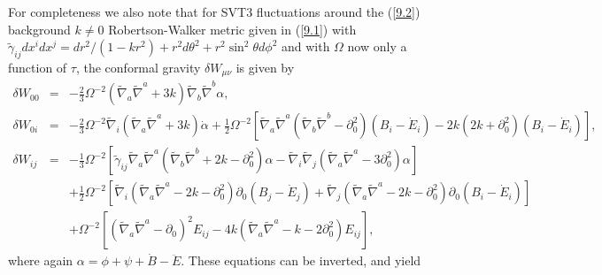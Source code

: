 \documentclass[aps,onecolumn,10pt]{revtex4}
\numberwithin{equation}{section}
\numberwithin{equation}{section}
\begin{document}
For completeness we also note that for  SVT3 fluctuations around the (\ref{9.2}) background $k\neq 0$ Robertson-Walker metric given in (\ref{9.1}) with $\tilde{\gamma}_{ij}dx^idx^j=dr^2/(1-kr^2)+r^2d\theta^2+r^2\sin^2\theta d\phi^2$ and with $\Omega$ now only a function of $\tau$, the conformal gravity $\delta W_{\mu\nu}$ is given by 
%
\begin{eqnarray}
\delta W_{00}&=& - \tfrac{2}{3} \Omega^{-2} (\tilde\nabla_a\tilde\nabla^a + 3k)\tilde\nabla_b\tilde\nabla^b \alpha,
 \nonumber\\ 
\delta W_{0i}&=& -\tfrac{2}{3} \Omega^{-2}  \tilde\nabla_i (\tilde\nabla_a\tilde\nabla^a + 3k)\dot\alpha
+\tfrac12 \Omega^{-2}\left[ \tilde\nabla_a\tilde\nabla^a (\tilde\nabla_b \tilde\nabla^b-\partial_0^2)(B_i-\dot{E}_i) -2k(2k+\partial_0^2)(B_i-\dot{E}_i)\right],
  \nonumber\\ 
\delta W_{ij}&=& -\tfrac{1}{3} \Omega^{-2} \left[ \tilde{\gamma}_{ij} \tilde\nabla_a\tilde\nabla^a (\tilde\nabla_b \tilde\nabla^b +2k-\partial_0^2)\alpha - \tilde\nabla_i\tilde\nabla_j(\tilde\nabla_a\tilde\nabla^a - 3\partial_0^2)\alpha \right]
\nonumber\\
&& +\tfrac{1}{2} \Omega^{-2} \left[ \tilde\nabla_i ( \tilde\nabla_a\tilde\nabla^a -2k-\partial_0^2) \partial_0 (B_j-\dot{E}_j) 
+  \tilde\nabla_j ( \tilde\nabla_a\tilde\nabla^a -2k-\partial_0^2) \partial_0 (B_i-\dot{E}_i)\right]
\nonumber\\
&&+ \Omega^{-2}\left[ (\tilde\nabla_a\tilde\nabla^a-\partial_0)^2 E_{ij} - 4k (\tilde\nabla_a\tilde\nabla^a - k-2\partial_0^2)E_{ij} \right],
\label{13.16}
\end{eqnarray}
%
where again $\alpha = \phi + \psi + \dot B - \ddot E$. These equations can be inverted, and yield
%
\end{document}
